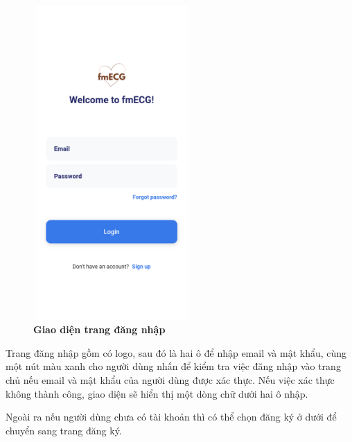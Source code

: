 \begin{figure}[H]
  \centering
  \includegraphics[width=6cm,height=12cm]{Images/mobile_app/demo/login.png}
  \caption[Giao diện trang đăng nhập]{\bfseries \fontsize{12pt}{0pt}\selectfont Giao diện trang đăng nhập}
  \label{demo_login} %
\end{figure}

Trang đăng nhập gồm có logo, sau đó là hai ô để nhập email và mật khẩu, cùng một nút màu xanh cho người dùng nhấn để kiểm tra 
việc đăng nhập vào
trang chủ nếu email và mật khẩu của người dùng được xác thực. Nếu việc xác thực không thành công, giao diện sẽ hiển thị
một dòng chữ dưới hai ô nhập.

Ngoài ra nếu người dùng chưa có tài khoản thì có thể chọn đăng ký ở dưới để chuyển sang trang đăng ký.

